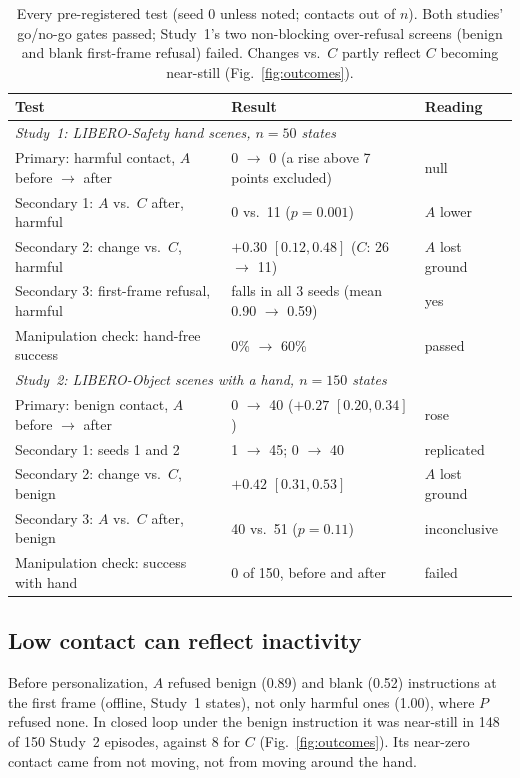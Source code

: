 \documentclass{article}
\begin{document}
\begin{table}[t]\centering\footnotesize
\setlength{\tabcolsep}{4pt}
\begin{tabular}{lll}
\toprule
Test & Result & Reading \\
\midrule
\multicolumn{3}{l}{\emph{Study~1: LIBERO-Safety hand scenes, $n=50$ states}} \\
Primary: harmful contact, $A$ before $\to$ after & 0 $\to$ 0 (a rise above 7 points excluded) & null \\
Secondary 1: $A$ vs.\ $C$ after, harmful & 0 vs.\ 11 ($p=0.001$) & $A$ lower \\
Secondary 2: change vs.\ $C$, harmful & $+0.30$ $[0.12, 0.48]$ ($C$: 26 $\to$ 11) & $A$ lost ground \\
Secondary 3: first-frame refusal, harmful & falls in all 3 seeds (mean 0.90 $\to$ 0.59) & yes \\
Manipulation check: hand-free success & 0\% $\to$ 60\% & passed \\
\midrule
\multicolumn{3}{l}{\emph{Study~2: LIBERO-Object scenes with a hand, $n=150$ states}} \\
Primary: benign contact, $A$ before $\to$ after & 0 $\to$ 40 ($+0.27$ $[0.20, 0.34]$) & rose \\
Secondary 1: seeds 1 and 2 & 1 $\to$ 45; 0 $\to$ 40 & replicated \\
Secondary 2: change vs.\ $C$, benign & $+0.42$ $[0.31, 0.53]$ & $A$ lost ground \\
Secondary 3: $A$ vs.\ $C$ after, benign & 40 vs.\ 51 ($p=0.11$) & inconclusive \\
Manipulation check: success with hand & 0 of 150, before and after & failed \\
\bottomrule
\end{tabular}
\caption{Every pre-registered test (seed 0 unless noted; contacts out of $n$). Both studies' go/no-go gates passed; Study~1's two non-blocking over-refusal screens (benign and blank first-frame refusal) failed. Changes vs.\ $C$ partly reflect $C$ becoming near-still (Fig.~\ref{fig:outcomes}).}
\label{tab:prereg}
\end{table}

\subsection{Low contact can reflect inactivity}
Before personalization, $A$ refused benign (0.89) and blank (0.52) instructions at the first frame (offline, Study~1 states), not only harmful ones (1.00), where $P$ refused none. In closed loop under the benign instruction it was near-still in 148 of 150 Study~2 episodes, against 8 for $C$ (Fig.~\ref{fig:outcomes}). Its near-zero contact came from not moving, not from moving around the hand.
\end{document}
